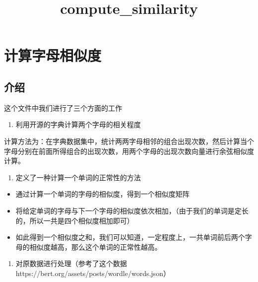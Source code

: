 \documentclass[11pt]{article}
\title{compute\_similarity}
\providecommand{\tightlist}{%
      \setlength{\itemsep}{0pt}\setlength{\parskip}{0pt}}
\begin{document}
    
    \maketitle
    
    

    
    \hypertarget{ux8ba1ux7b97ux5b57ux6bcdux76f8ux4f3cux5ea6}{%
\section{计算字母相似度}\label{ux8ba1ux7b97ux5b57ux6bcdux76f8ux4f3cux5ea6}}

\hypertarget{ux4ecbux7ecd}{%
\subsection{介绍}\label{ux4ecbux7ecd}}

这个文件中我们进行了三个方面的工作

\begin{enumerate}
\def\labelenumi{\arabic{enumi}.}
\tightlist
\item
  利用开源的字典计算两个字母的相关程度
\end{enumerate}

计算方法为：在字典数据集中，统计两两字母相邻的组合出现次数，然后计算当个字母分别在前面所得组合的出现次数，用两个字母的出现次数向量进行余弦相似度计算。

\begin{enumerate}
\def\labelenumi{\arabic{enumi}.}
\setcounter{enumi}{1}
\tightlist
\item
  定义了一种计算一个单词的正常性的方法
\end{enumerate}

\begin{itemize}
\tightlist
\item
  通过计算一个单词的字母的相似度，得到一个相似度矩阵
\item
  将给定单词的字母与下一个字母的相似度依次相加，（由于我们的单词是定长的，所以一共是四个相似度相加即可）
\item
  如此得到一个相似度之和，我们可以知道，一定程度上，一共单词前后两个字母的相似度越高，那么这个单词的正常性越高。
\end{itemize}

\begin{enumerate}
\def\labelenumi{\arabic{enumi}.}
\setcounter{enumi}{2}
\tightlist
\item
  对原数据进行处理（参考了这个数据https://bert.org/assets/posts/wordle/words.json）
\end{enumerate}
\end{document}

